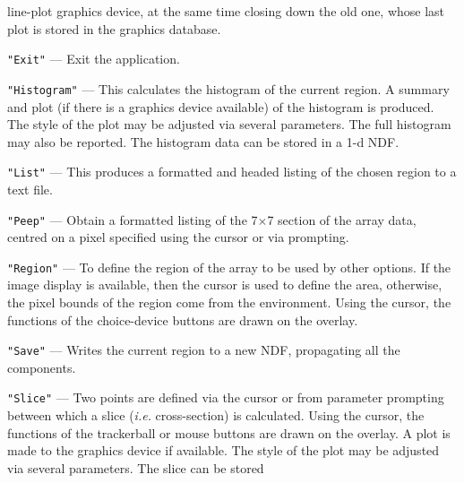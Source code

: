 \documentclass[twoside,11pt,nolof]{starlink}
\begin{document}
{{{\begin{description}
                          line-plot graphics device, at the same time
                          closing down the old one, whose last plot is
                          stored in the graphics database.
         \item \texttt{"Exit"} --- Exit the application.
         \item \texttt{"Histogram"} --- This calculates the histogram of the current
                          region. A summary and plot (if there is a
                          graphics device available) of the histogram
                          is produced.  The style of the plot may be
                          adjusted via several parameters.  The full
                          histogram may also be reported. The histogram
                          data can be stored in a 1-d NDF.
         \item \texttt{"List"} --- This produces a formatted and headed listing
                          of the chosen region to a text file.
         \item \texttt{"Peep"} --- Obtain a formatted listing of the 7$\times$7 section
                          of the array data, centred on a pixel
                          specified using the cursor or via prompting.
         \item \texttt{"Region"} --- To define the region of the array to be used
                          by other options. If the image display
                          is available, then the cursor is used to
                          define the area, otherwise, the pixel bounds
                          of the region come from the environment. Using
                          the cursor, the functions of the choice-device
                          buttons are drawn on the overlay.
         \item \texttt{"Save"} --- Writes the current region to a new NDF,
                          propagating all the components.
         \item \texttt{"Slice"} --- Two points are defined via the cursor or from
                          parameter prompting between which a slice ({\it i.e.}
                          cross-section) is calculated.  Using the
                          cursor, the functions of the trackerball or
                          mouse buttons are drawn on the overlay. A plot
                          is made to the graphics device if available.
                          The style of the plot may be adjusted via
                          several parameters.  The slice can be stored

\end{description}}}}
\end{document}
